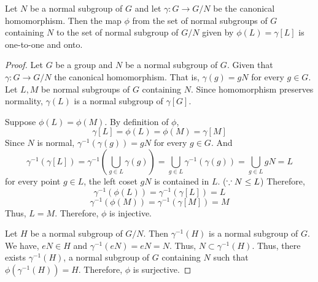 \begin{lemma}
	Let $N$ be a normal subgroup of $G$ and let $\gamma : G \to G/N$ be the canonical homomorphism.
	Then the map $\phi$ from the set of normal subgroups of $G$ containing $N$ to the set of normal subgroup of $G/N$ given by $\phi(L) = \gamma[L]$ is one-to-one and onto.
\end{lemma}
\begin{proof}
	Let $G$ be a group and $N$ be a normal subgroup of $G$.
	Given that $\gamma : G \to G/N$ the canonical homomorphism.
	That is, $\gamma(g) = gN$ for every $g \in G$.
	Let $L,M$ be normal subgroups of $G$ containing $N$.
	Since homomorphism preserves normality, $\gamma(L)$ is a normal subgroup of $\gamma[G]$.

	Suppose $\phi(L) = \phi(M)$.
	By definition of $\phi$,
	\begin{equation*}
		\gamma[L] = \phi(L) = \phi(M) = \gamma[M]
	\end{equation*}
	Since $N$ is normal, $\gamma^{-1}(\gamma(g)) = gN$ for every $g \in G$.
	And
	\begin{equation*}
		\gamma^{-1}(\gamma[L]) = \gamma^{-1} \left( \bigcup_{g \in L} \gamma(g) \right) = \bigcup_{g \in L} \gamma^{-1}(\gamma(g)) = \bigcup_{g \in L} gN = L
	\end{equation*}
	for every point $g \in L$, the left coset $gN$ is contained in $L$. ($\because N \le L$)
	Therefore,
	\begin{equation*}
		\gamma^{-1} (\phi(L))  = \gamma^{-1} (\gamma[L]) = L 
	\end{equation*}
	\begin{equation*}
		\gamma^{-1} (\phi(M)) = \gamma^{-1} (\gamma[M]) = M
	\end{equation*}
	Thus, $L = M$.
	Therefore, $\phi$ is injective.

	Let $H$ be a normal subgroup of $G/N$.
	Then $\gamma^{-1}(H)$ is a normal subgroup of $G$.
	We have, $eN \in H$ and $\gamma^{-1}(eN) = eN = N$.
	Thus, $N \subset \gamma^{-1}(H)$.
	Thus, there exists $\gamma^{-1}(H)$, a normal subgroup of $G$ containing $N$ such that $\phi(\gamma^{-1}(H)) = H$.
	Therefore, $\phi$ is surjective.
\end{proof}

